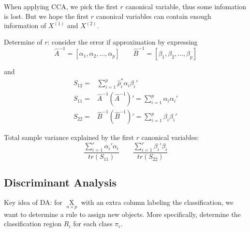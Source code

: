     When applying CCA, we pick the first $ r $ canonical variable, thus some infomation is lost. But we hope the first $ r $ canonical variables can contain enough information of $ X^{(1)} $ and $ X^{(2)} $.

    Determine of $ r $: consider the error if approximation by expressing
    \begin{equation}
        \hat{A}^{-1}=[\alpha _1,\alpha _2,\ldots,\alpha _p]\qquad \hat{B}^{-1}=[\beta _1,\beta _2,\ldots,\beta _p] 
    \end{equation}

    and 
    \begin{align*}
        S_{12}=&\sum_{i=1}^p \hat{\rho }^*_i\alpha _i\beta _i'\\
        S_{11}=&\hat{A}^{-1}(\hat{A}^{-1})'=\sum_{i=1}^p\alpha _i\alpha _i'\\
        S_{22}=&\hat{B}^{-1}(\hat{B}^{-1})'=\sum_{i=1}^p\beta _i\beta _i'
    \end{align*}
    
    Total sample variance explained by the first $ r $ canonical variables:
    \begin{equation}
        \dfrac{\sum_{i=1}^r\alpha _i'\alpha _i}{tr(S_{11})}\qquad \dfrac{\sum_{i=1}^r\beta _i'\beta _i}{tr(S_{22})} 
    \end{equation}
    
    



\subsection{Discriminant Analysis}\label{SubSectionDiscriminantAnalysis}
    Key idea of DA: for $ \mathop{X}\limits_{n\times p}  $ with an extra column labeling the classification, we want to determine a rule to assign new objects. More specifically, determine the classification region $ R_i $ for each class $ \pi_i $.

